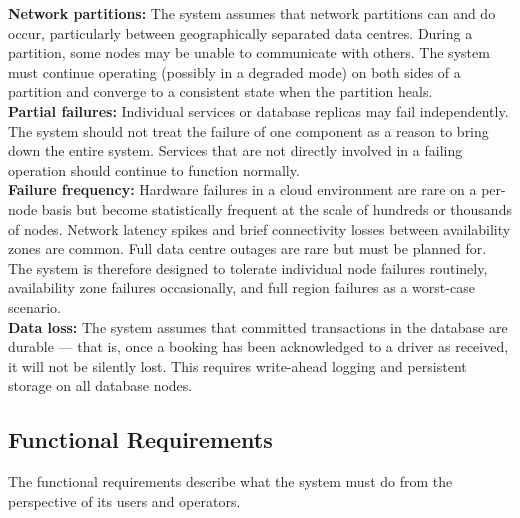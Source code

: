 \documentclass{article}
\begin{document}
\textbf{Network partitions:} The system assumes that network partitions can and do occur, particularly between geographically separated data centres. During a partition, some nodes may be unable to communicate with others. The system must continue operating (possibly in a degraded mode) on both sides of a partition and converge to a consistent state when the partition heals.
\\

\textbf{Partial failures:} Individual services or database replicas may fail independently. The system should not treat the failure of one component as a reason to bring down the entire system. Services that are not directly involved in a failing operation should continue to function normally.\\

\textbf{Failure frequency:} Hardware failures in a cloud environment are rare on a per-node basis but become statistically frequent at the scale of hundreds or thousands of nodes. Network latency spikes and brief connectivity losses between availability zones are common. Full data centre outages are rare but must be planned for. The system is therefore designed to tolerate individual node failures routinely, availability zone failures occasionally, and full region failures as a worst-case scenario.\\
\textbf{Data loss:} The system assumes that committed transactions in the database are durable — that is, once a booking has been acknowledged to a driver as received, it will not be silently lost. This requires write-ahead logging and persistent storage on all database nodes.

\subsection{Functional Requirements}
The functional requirements describe what the system must do from the perspective of its users and operators.\\
\end{document}
